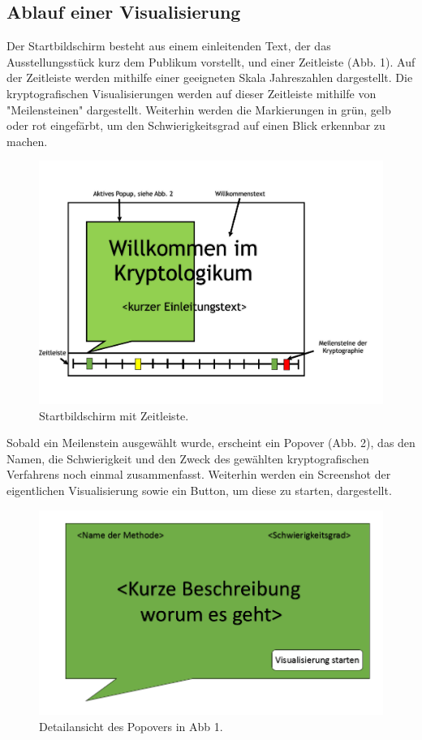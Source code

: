 \documentclass{article}
\begin{document}
\subsection{Ablauf einer Visualisierung}

Der Startbildschirm besteht aus einem einleitenden Text, der das Ausstellungsstück kurz dem Publikum vorstellt, und einer Zeitleiste (Abb. 1). Auf der Zeitleiste werden mithilfe einer geeigneten Skala Jahreszahlen dargestellt. Die kryptografischen Visualisierungen werden auf dieser Zeitleiste mithilfe von "Meilensteinen" dargestellt. Weiterhin werden die Markierungen in grün, gelb oder rot eingefärbt, um den Schwierigkeitsgrad auf einen Blick erkennbar zu machen.

\begin{figure}[H]
  \centering
    \includegraphics[width=\textwidth]{resources/ui_walkthrough_start-draft}
  \caption{Startbildschirm mit Zeitleiste.}
\end{figure}

Sobald ein Meilenstein ausgewählt wurde, erscheint ein Popover (Abb. 2), das den Namen, die Schwierigkeit und den Zweck des gewählten kryptografischen Verfahrens noch einmal zusammenfasst. Weiterhin werden ein Screenshot der eigentlichen Visualisierung sowie ein Button, um diese zu starten, dargestellt.

\begin{figure}[H]
  \centering
    \includegraphics[width=\textwidth]{resources/ui_walkthrough_popover-draft}
  \caption{Detailansicht des Popovers in Abb 1.}
\end{figure}
\end{document}
